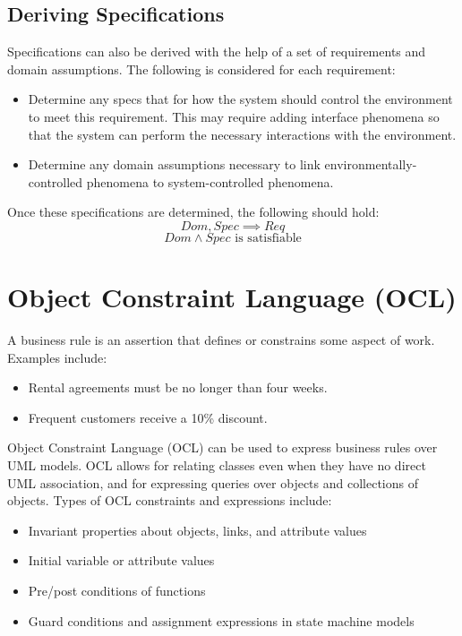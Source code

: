 \documentclass[12pt,titlepage]{article}
\let\stdsection\section
\renewcommand\section{\clearpage\stdsection}
\begin{document}
    \subsection{Deriving Specifications}
      Specifications can also be derived with the help of a set of requirements and domain assumptions. The following is considered for each requirement:
      \begin{itemize}
        \item Determine any specs that for how the system should control the environment to meet this requirement. This may require adding interface phenomena
          so that the system can perform the necessary interactions with the environment.
        \item Determine any domain assumptions necessary to link environmentally-controlled phenomena to system-controlled phenomena.
      \end{itemize}

      Once these specifications are determined, the following should hold:
      $$ Dom, Spec \implies Req $$
      $$ Dom \land Spec \text{ is satisfiable}$$

  \section{Object Constraint Language (OCL)}
    A business rule is an assertion that defines or constrains some aspect of work. Examples include:
    \begin{itemize}
      \item Rental agreements must be no longer than four weeks.
      \item Frequent customers receive a 10\% discount.
    \end{itemize}

    Object Constraint Language (OCL) can be used to express business rules over UML models. OCL allows for relating classes even when they have no direct UML
    association, and for expressing queries over objects and collections of objects. Types of OCL constraints and expressions include:
    \begin{itemize}
      \item Invariant properties about objects, links, and attribute values
      \item Initial variable or attribute values
      \item Pre/post conditions of functions
      \item Guard conditions and assignment expressions in state machine models
    \end{itemize}
\end{document}
